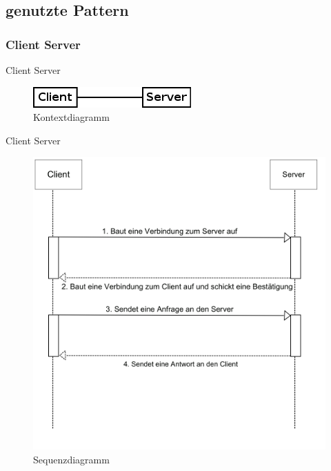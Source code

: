\documentclass{beamer}
\begin{document}
	\subsection{genutzte Pattern}
	\subsubsection{Client Server}
	\begin{frame}{Client Server}
		\begin{figure}
			\centering
			\includegraphics[width=0.7\linewidth]{../Grafik/Diagramm/Pattern/ClientServer/Kontext}
			\caption{Kontextdiagramm}
			\label{fig:Kontext1}
		\end{figure}
	\end{frame}
	\begin{frame}{Client Server}	
		\begin{figure}
			\centering
			\includegraphics[height=0.8\textheight]{../Grafik/Diagramm/Pattern/ClientServer/Sequenzdiagramm}
			\caption{Sequenzdiagramm}
			\label{fig:Sequenz1}
		\end{figure}
	\end{frame}
	
\end{document}
